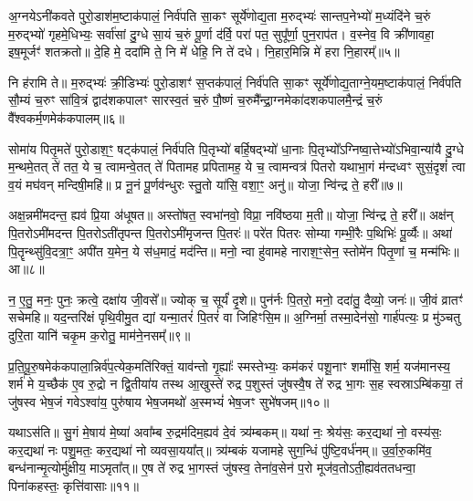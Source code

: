 {\anuvakamend[{व॒यं यद् विꣳ॑श॒तिश्च॑॥३॥}]}

अ॒ग्नये\-ऽनी॑कवते पुरो॒डाश॑म॒ष्टाक॑पालं॒ निर्व॑पति सा॒कꣳ सूर्ये॑णोद्य॒ता म॒रुद्भ्यः॑ सान्तप॒नेभ्यो॑ म॒ध्यंदि॑ने च॒रुं म॒रुद्भ्यो॑ गृहमे॒धिभ्यः॒ सर्वा॑सां दु॒ग्धे सा॒यं च॒रुं पू॒र्णा द॑र्वि॒ परा॑ पत॒ सुपू᳚र्णा॒ पुन॒राप॑त। व॒स्नेव॒ वि क्री॑णावहा॒ इष॒मूर्जꣳ॑ शतक्रतो॥ दे॒हि मे॒ ददा॑मि ते॒ नि मे॑ धेहि॒ नि ते॑ दधे। नि॒हार॒मिन्नि मे॑ हरा नि॒हारम्᳚॥५॥

नि ह॑रामि ते॥ म॒रुद्भ्यः॑ क्री॒डिभ्यः॑ पुरो॒डाशꣳ॑ स॒प्तक॑पालं॒ निर्व॑पति सा॒कꣳ सूर्ये॑णोद्य॒ताग्ने॒यम॒ष्टाक॑पालं॒ निर्व॑पति सौ॒म्यं च॒रुꣳ सा॑वि॒त्रं द्वाद॑शकपालꣳ सारस्व॒तं च॒रुं पौ॒ष्णं च॒रुमै᳚न्द्रा॒ग्नमेका॑दशकपालमै॒न्द्रं च॒रुं वै᳚श्वकर्म॒णमेक॑कपालम्॥६॥

{\anuvakamend[{ह॒रा॒ नि॒हारं॑ त्रि॒ꣳ॒शच्च॑॥४॥}]}

सोमा॑य पितृ॒मते॑ पुरो॒डाश॒ꣳ॒ षट्क॑पालं॒ निर्व॑पति पि॒तृभ्यो॑ बर्\mbox{}हि॒षद्भ्यो॑ धा॒नाः पि॒तृभ्यो᳚\-ऽग्निष्वा॒त्तेभ्यो॑\-ऽभिवा॒न्या॑यै दु॒ग्धे म॒न्थमे॒तत् ते॑ तत॒ ये च॒ त्वामन्वे॒तत् ते॑ पितामह प्रपितामह॒ ये च॒ त्वामन्वत्र॑ पितरो यथाभा॒गं म॑न्दध्वꣳ सुसं॒दृशं॑ त्वा व॒यं मघ॑वन् मन्दिषी॒महि॑॥ प्र नू॒नं पू॒र्णव॑न्धुरः स्तु॒तो या॑सि॒ वशा॒ꣳ॒ अनु॑॥ योजा॒ न्वि॑न्द्र ते॒ हरी᳚॥७॥

अक्ष॒न्नमी॑मदन्त॒ ह्यव॑ प्रि॒या अ॑धूषत॥ अस्तो॑षत॒ स्वभा॑नवो॒ विप्रा॒ नवि॑ष्ठया म॒ती॥ योजा॒ न्वि॑न्द्र ते॒ हरी᳚॥ अक्ष॑न् पि॒तरो\-ऽमी॑मदन्त पि॒तरो\-ऽती॑तृपन्त पि॒तरो\-ऽमी॑मृजन्त पि॒तरः॑॥ परे॑त पितरः सोम्या गम्भी॒रैः प॒थिभिः॑ पू॒र्व्यैः॥ अथा॑ पि॒तॄन्थ्सु॑वि॒दत्रा॒ꣳ॒ अपी॑त य॒मेन॒ ये स॑ध॒मादं॒ मद॑न्ति॥ मनो॒ न्वा हु॑वामहे नाराश॒ꣳ॒सेन॒ स्तोमे॑न पितृ॒णां च॒ मन्म॑भिः॥ आ॥८॥

न॒ ए॒तु॒ मनः॒ पुनः॒ क्रत्वे॒ दक्षा॑य जी॒वसे᳚॥ ज्योक् च॒ सूर्यं॑ दृ॒शे॥ पुन॑र्नः पि॒तरो॒ मनो॒ ददा॑तु॒ दैव्यो॒ जनः॑॥ जी॒वं व्रातꣳ॑ सचेमहि॥ यद॒न्तरि॑क्षं पृथि॒वीमु॒त द्यां यन्मा॒तरं॑ पि॒तरं॑ वा जिहिꣳसि॒म॥ अ॒ग्निर्मा॒ तस्मा॒देन॑सो॒ गार्\mbox{}ह॑पत्यः॒ प्र मु॑ञ्चतु दुरि॒ता यानि॑ चकृ॒म क॒रोतु॒ माम॑ने॒नसम्᳚॥९॥

{\anuvakamend[{हरी॒ मन्म॑भि॒रा चतु॑श्चत्वारिꣳशच्च॥५॥}]}

प्र॒ति॒पू॒रु॒षमेक॑कपाला॒न्निर्व॑प॒त्येक॒मति॑रिक्तं॒ याव॑न्तो गृ॒ह्याः᳚ स्मस्तेभ्यः॒ कम॑करं पशू॒नाꣳ शर्मा॑सि॒ शर्म॒ यज॑मानस्य॒ शर्म॑ मे य॒च्छैक॑ ए॒व रु॒द्रो न द्वि॒तीया॑य तस्थ आ॒खुस्ते॑ रुद्र प॒शुस्तं जु॑षस्वै॒ष ते॑ रुद्र भा॒गः स॒ह स्वस्रा\-ऽम्बि॑कया॒ तं जु॑षस्व भेष॒जं गवे\-ऽश्वा॑य॒ पुरु॑षाय भेष॒जमथो॑ अ॒स्मभ्यं॑ भेष॒जꣳ सुभे॑षजम्॥१०॥

यथा\-ऽस॑ति॥ सु॒गं मे॒षाय॑ मे॒ष्या॑ अवा᳚म्ब रु॒द्रम॑दिम॒ह्यव॑ दे॒वं त्र्य॑म्बकम्॥ यथा॑ नः॒ श्रेय॑सः॒ कर॒द्यथा॑ नो॒ वस्य॑सः॒ कर॒द्यथा॑ नः पशु॒मतः॒ कर॒द्यथा॑ नो व्यवसा॒यया᳚त्॥ त्र्य॑म्बकं यजामहे सुग॒न्धिं पु॑ष्टि॒वर्ध॑नम्॥ उ॒र्वा॒रु॒कमि॑व॒ बन्ध॑नान्मृ॒त्योर्मु॑क्षीय॒ मा\-ऽमृता᳚त्॥ ए॒ष ते॑ रुद्र भा॒गस्तं जु॑षस्व॒ तेना॑व॒सेन॑ प॒रो मूज॑व॒तो\-ऽती॒ह्यव॑ततधन्वा॒ पिना॑कहस्तः॒ कृत्ति॑वासाः॥११॥

